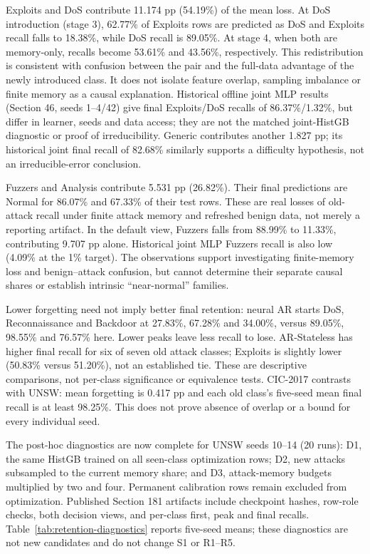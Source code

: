 \documentclass[10pt,twocolumn]{article}
\begin{document}
Exploits and DoS contribute 11.174 pp (54.19\%) of the mean loss. At DoS introduction (stage 3), 62.77\% of Exploits rows are predicted as DoS and Exploits recall falls to 18.38\%, while DoS recall is 89.05\%. At stage 4, when both are memory-only, recalls become 53.61\% and 43.56\%, respectively. This redistribution is consistent with confusion between the pair and the full-data advantage of the newly introduced class. It does not isolate feature overlap, sampling imbalance or finite memory as a causal explanation. Historical offline joint MLP results (Section 46, seeds 1--4/42) give final Exploits/DoS recalls of 86.37\%/1.32\%, but differ in learner, seeds and data access; they are not the matched joint-HistGB diagnostic or proof of irreducibility. Generic contributes another 1.827 pp; its historical joint final recall of 82.68\% similarly supports a difficulty hypothesis, not an irreducible-error conclusion.

Fuzzers and Analysis contribute 5.531 pp (26.82\%). Their final predictions are Normal for 86.07\% and 67.33\% of their test rows. These are real losses of old-attack recall under finite attack memory and refreshed benign data, not merely a reporting artifact. In the default view, Fuzzers falls from 88.99\% to 11.33\%, contributing 9.707 pp alone. Historical joint MLP Fuzzers recall is also low (4.09\% at the 1\% target). The observations support investigating finite-memory loss and benign--attack confusion, but cannot determine their separate causal shares or establish intrinsic ``near-normal'' families.

Lower forgetting need not imply better final retention: neural AR starts DoS, Reconnaissance and Backdoor at 27.83\%, 67.28\% and 34.00\%, versus 89.05\%, 98.55\% and 76.57\% here. Lower peaks leave less recall to lose. AR-Stateless has higher final recall for six of seven old attack classes; Exploits is slightly lower (50.83\% versus 51.20\%), not an established tie. These are descriptive comparisons, not per-class significance or equivalence tests. CIC-2017 contrasts with UNSW: mean forgetting is 0.417 pp and each old class's five-seed mean final recall is at least 98.25\%. This does not prove absence of overlap or a bound for every individual seed.

The post-hoc diagnostics are now complete for UNSW seeds 10--14 (20 runs): D1, the same HistGB trained on all seen-class optimization rows; D2, new attacks subsampled to the current memory share; and D3, attack-memory budgets multiplied by two and four. Permanent calibration rows remain excluded from optimization. Published Section 181 artifacts include checkpoint hashes, row-role checks, both decision views, and per-class first, peak and final recalls. Table~\ref{tab:retention-diagnostics} reports five-seed means; these diagnostics are not new candidates and do not change S1 or R1--R5.
\end{document}
